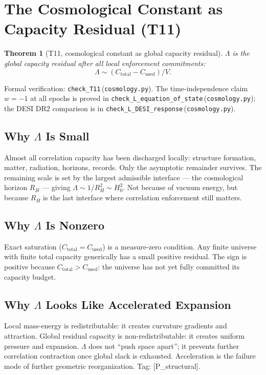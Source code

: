 \documentclass[11pt]{article}
\newtheorem{theorem}{Theorem}[section]
\newcommand{\coderef}[2]{\texttt{#1}\,(\texttt{#2})}
\begin{document}
\section{The Cosmological Constant as Capacity Residual (T11)}

\begin{theorem}[T11, cosmological constant as global capacity residual]
$\Lambda$ is the global capacity residual after all local enforcement
commitments:
\[
\Lambda \sim (C_{\mathrm{total}} - C_{\mathrm{used}}) / V.
\]
\end{theorem}
Formal verification: \coderef{check\_T11}{cosmology.py}. The time-independence
claim $w = -1$ at all epochs is proved in \coderef{check\_L\_equation\_of\_state}{cosmology.py};
the DESI DR2 comparison is in \coderef{check\_L\_DESI\_response}{cosmology.py}.

\subsection{Why $\Lambda$ Is Small}
Almost all correlation capacity has been discharged locally: structure
formation, matter, radiation, horizons, records. Only the asymptotic remainder
survives. The remaining scale is set by the largest admissible interface --- the
cosmological horizon $R_H$ --- giving $\Lambda \sim 1/R_H^2 \sim H_0^2$. Not
because of vacuum energy, but because $R_H$ is the last interface where
correlation enforcement still matters.

\subsection{Why $\Lambda$ Is Nonzero}
Exact saturation ($C_{\mathrm{total}} = C_{\mathrm{used}}$) is a measure-zero
condition. Any finite universe with finite total capacity generically has a
small positive residual. The sign is positive because $C_{\mathrm{total}} >
C_{\mathrm{used}}$: the universe has not yet fully committed its capacity
budget.

\subsection{Why $\Lambda$ Looks Like Accelerated Expansion}
Local mass-energy is redistributable: it creates curvature gradients and
attraction. Global residual capacity is non-redistributable: it creates uniform
pressure and expansion. $\Lambda$ does not ``push space apart''; it prevents
further correlation contraction once global slack is exhausted. Acceleration is
the failure mode of further geometric reorganization. Tag: [P\_structural].
\end{document}
